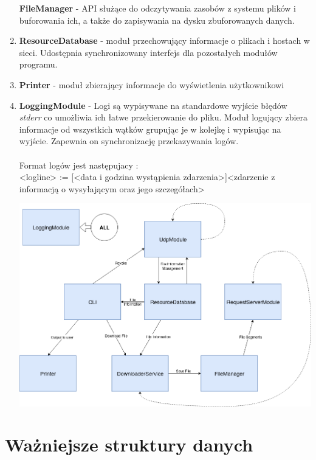 \documentclass[11pt,oneside]{book}
\newcommand{\+}{\discretionary{\mbox{\scriptsize$\hookleftarrow$}}{}{}}
\begin{document}
\begin{enumerate}
\textbf{FileManager} - API służące do odczytywania zasobów z systemu plików i buforowania ich, a także do zapisywania na dysku zbuforowanych danych.
	\item 
\textbf{ResourceDatabase} - moduł przechowujący informacje o plikach i hostach w sieci. Udostępnia synchronizowany interfejs dla pozostałych modułów programu.
	\item 
\textbf{Printer} - moduł zbierający informacje do wyświetlenia użytkownikowi
	\item 
\textbf{LoggingModule} - Logi są wypisywane na standardowe wyjście błędów \textit{stderr} co umożliwia ich łatwe przekierowanie do pliku. Moduł logujący zbiera informacje od wszystkich wątków grupując je w kolejkę i wypisując na wyjście. Zapewnia on synchronizację przekazywania logów.
\\\\
Format logów jest następujacy : \\
<logline> := [<data i godzina wystąpienia zdarzenia>]<zdarzenie z informacją o wysyłającym oraz jego szczegółach>

\begin{centering}
	\includegraphics[width=\textwidth]{modules}
\end{centering}

\end{enumerate}
\section{Ważniejsze struktury danych}
\end{document}
